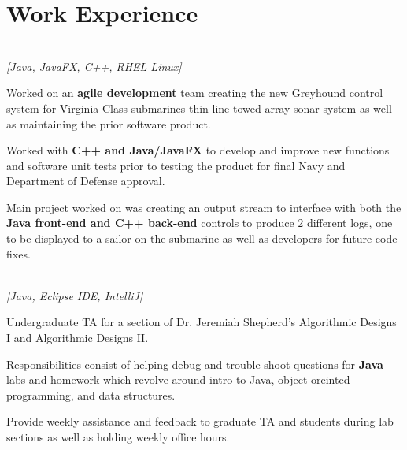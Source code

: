 \documentclass[letterpaper]{deedy-resume}
\begin{document}
\begin{minipage}[t]{0.69\textwidth} 

\section{Work Experience}

 \\  \emph{[Java, JavaFX, C++, RHEL Linux]}\\

\vspace{\topsep} 
\begin{tightitemize}
\item Worked on an \textbf{agile development} team creating the new Greyhound control system for Virginia Class submarines thin line towed array sonar system as well as maintaining the prior software product.
\item Worked with \textbf{C++ and Java/JavaFX} to develop and improve new functions and software unit tests prior to testing the product for final Navy and Department of Defense approval. 
\item Main project worked on was creating an output stream to interface with both the \textbf{Java front-end and C++ back-end} controls to produce 2 different logs, one to be displayed to a sailor on the submarine as well as developers for future code fixes.
\end{tightitemize}

\sectionspace

 \\
 \color{gray} \emph{[Java, Eclipse IDE, IntelliJ]}\\

\vspace{\topsep} 
\begin{tightitemize}
\item Undergraduate TA for a section of Dr. Jeremiah Shepherd's Algorithmic Designs I and Algorithmic Designs II.
\item Responsibilities consist of helping debug and trouble shoot questions for \textbf{Java} labs and homework which revolve around intro to Java, object oreinted programming, and data structures.
\item Provide weekly assistance and feedback to graduate TA and students during lab sections as well as holding weekly office hours.
\end{tightitemize}



\end{minipage}
\end{document}
